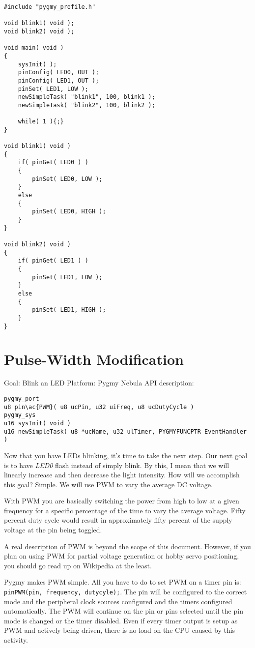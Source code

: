 \documentclass{article}
\begin{document}
\begin{lstlisting}
#include "pygmy_profile.h"

void blink1( void );
void blink2( void );

void main( void )
{
	sysInit( );
	pinConfig( LED0, OUT );
	pinConfig( LED1, OUT );
	pinSet( LED1, LOW );
	newSimpleTask( "blink1", 100, blink1 );
	newSimpleTask( "blink2", 100, blink2 );

	while( 1 ){;}
}

void blink1( void )
{
	if( pinGet( LED0 ) )
	{
		pinSet( LED0, LOW );
	}
	else
	{
		pinSet( LED0, HIGH );
	}
}

void blink2( void )
{
	if( pinGet( LED1 ) )
	{
		pinSet( LED1, LOW );
	}
	else
	{
		pinSet( LED1, HIGH );
	}
}
\end{lstlisting}

\section{Pulse-Width Modification}
Goal: Blink an LED
Platform: Pygmy Nebula
API description:
\begin{lstlisting}
pygmy_port
u8 pin\ac{PWM}( u8 ucPin, u32 uiFreq, u8 ucDutyCycle )
pygmy_sys
u16 sysInit( void )
u16 newSimpleTask( u8 *ucName, u32 ulTimer, PYGMYFUNCPTR EventHandler )
\end{lstlisting}

Now that you have LEDs blinking, it's time to take the next step. Our next goal is to have \emph{LED0} flash instead of simply blink. By this, I mean that we will linearly increase and then decrease the light intensity. How will we accomplish this goal? Simple. We will use \ac{PWM} to vary the average DC voltage.

With \ac{PWM} you are basically switching the power from high to low at a given frequency for a specific percentage of the time to vary the average voltage. Fifty percent duty cycle would result in approximately fifty percent of the supply voltage at the pin being toggled.

A real description of \ac{PWM} is beyond the scope of this document. However, if you plan on using \ac{PWM} for partial voltage generation or hobby servo positioning, you should go read up on Wikipedia at the least.

Pygmy makes \ac{PWM} simple. All you have to do to set \ac{PWM} on a timer pin is: \verb|pinPWM(pin, frequency, dutycyle);|. The pin will be configured to the correct mode and the peripheral clock sources configured and the timers configured automatically. The \ac{PWM} will continue on the pin or pins selected until the pin mode is changed or the timer disabled. Even if every timer output is setup as \ac{PWM} and actively being driven, there is no load on the CPU caused by this activity.
\end{document}
